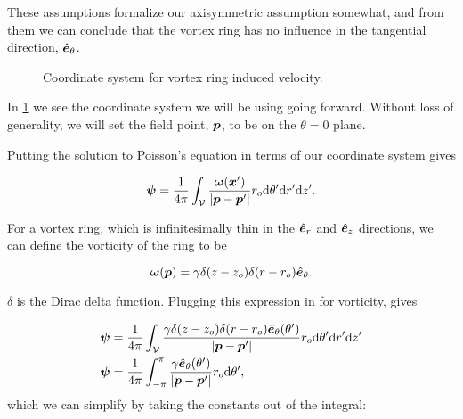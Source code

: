 \begin{assumption}{}
    \vspace*{-\baselineskip}
\end{assumption}

\begin{assumption}{}
    \vspace*{-\baselineskip}
\end{assumption}
%
These assumptions formalize our axisymmetric assumption somewhat, and from them we can conclude that the vortex ring has no influence in the tangential direction, \(\hat{\bm{e}}_\theta\).

\begin{figure}[h!]
    \centering
        
        \caption{Coordinate system for vortex ring induced velocity.}
    \label{fig:vortexringgeom}
\end{figure}

In \cref{fig:vortexringgeom} we see the coordinate system we will be using going forward.
%
Without loss of generality, we will set the field point, \(\bm{p}\), to be on the \(\theta = 0\) plane.
%

Putting the solution to Poisson's equation in terms of our coordinate system gives

\begin{equation}
    \label{eqn:psi2}
    \bm{\psi} = \frac{1}{4\pi} \int_{\mathcal{V}} \frac{\bm{\omega}(\bm{x}')}{|\bm{p}-\bm{p}'|} r_o \mathrm{d}\theta' \mathrm{d}{r'} \mathrm{d}{z'}.
\end{equation}

For a vortex ring, which is infinitesimally thin in the \(\hat{\bm{e}}_r\) and \(\hat{\bm{e}}_z\) directions, we can define the vorticity of the ring to be

\begin{equation}
    \bm{\omega}(\bm{p}) = \gamma \delta(z-z_o) \delta(r-r_o) \hat{\bm{e}}_\theta.
\end{equation}

\where \(\delta\) is the Dirac delta function.
%
Plugging this expression in for vorticity, gives

\begin{equation}
    \label{eqn:psi3}
    \begin{aligned}
        \bm{\psi} &= \frac{1}{4\pi} \int_{\mathcal{V}} \frac{\gamma \delta(z-z_o) \delta(r-r_o) \hat{\bm{e}}_\theta(\theta')}{|\bm{p}-\bm{p}'|} r_o \mathrm{d}\theta' \mathrm{d}{r'} \mathrm{d}{z'} \\
        \bm{\psi} &= \frac{1}{4\pi} \int_{-\pi}^{\pi} \frac{\gamma \hat{\bm{e}}_\theta(\theta')}{|\bm{p}-\bm{p}'|}r_o \mathrm{d}\theta',
    \end{aligned}
\end{equation}
%
which we can simplify by taking the constants out of the integral:

